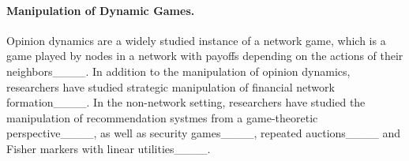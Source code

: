 
\paragraph{Manipulation of Dynamic Games.} Opinion dynamics are a widely studied instance of a network game, which is a game played by nodes in a network with payoffs depending on the actions of their neighbors____. In addition to the manipulation of opinion dynamics, researchers have studied strategic manipulation of financial network formation____. In the non-network setting, researchers have studied the manipulation of recommendation systmes from a game-theoretic perspective____, as well as security games____, repeated auctions____ and Fisher markers with linear utilities____. 





